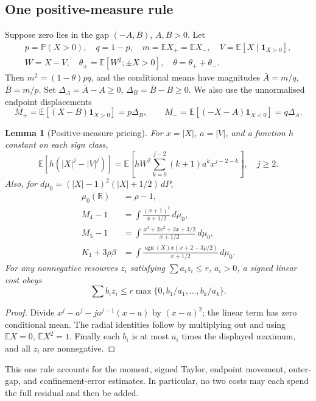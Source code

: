 \documentclass[11pt,a4paper]{article}
\numberwithin{equation}{section}
\newtheorem{lemma}[theorem]{Lemma}
\theoremstyle{definition}
\theoremstyle{remark}
\newcommand{\E}{\mathbb E}
\newcommand{\Pp}{\mathbb P}
\newcommand{\R}{\mathbb R}
\begin{document}
\subsection{One positive-measure rule}
Suppose zero lies in the gap $(-A,B)$, $A,B>0$. Let
\[\begin{gathered}
 p=\Pp(X>0),\quad q=1-p,\quad m=\E X_+=\E X_-,\quad V=\E[X\mid\mathbf1_{X>0}],\\
 W=X-V,\quad\theta_\pm=\E[W^2;\pm X>0],\quad\theta=\theta_++\theta_-.
\end{gathered}\]
Then $m^2=(1-\theta)pq$, and the conditional means have magnitudes
$\bar A=m/q$, $\bar B=m/p$. Set
$\Delta_A=\bar A-A\ge0$, $\Delta_B=\bar B-B\ge0$.
We also use the unnormalised endpoint displacements
\[
 M_+=\E[(X-B)\mathbf1_{X>0}]=p\Delta_B,\qquad
 M_-=\E[(-X-A)\mathbf1_{X<0}]=q\Delta_A.
\]

\begin{lemma}[Positive-measure pricing]\label{cut49:re:pricing}
For $x=|X|$, $a=|V|$, and a function $h$ constant on each sign class,
\begin{equation}\label{cut49:re:conditional}
 \E[h(|X|^j-|V|^j)]
 =\E\left[hW^2\sum_{k=0}^{j-2}(k+1)a^kx^{j-2-k}\right],\quad j\ge2.
\end{equation}
Also, for $d\mu_0=(|X|-1)^2(|X|+1/2)\,dP$,
\begin{align*}
 \mu_0(\R)&=\rho-1,\\
 M_4-1&=\int\frac{(x+1)^2}{x+1/2}\,d\mu_0,\\
 M_5-1&=\int\frac{x^3+2x^2+3x+3/2}{x+1/2}\,d\mu_0,\\
 K_1+3\rho\beta&=\int
  \frac{\operatorname{sgn}(X)x(x+2-3\rho/2)}{x+1/2}\,d\mu_0.
\end{align*}
For any nonnegative resources $z_i$ satisfying $\sum a_i z_i\le r$,
$a_i>0$, a signed linear cost obeys
\begin{equation}\label{cut49:re:simplex}
 \sum b_i z_i\le r\max\{0,b_1/a_1,\ldots,b_k/a_k\}.
\end{equation}
\end{lemma}
\begin{proof}
Divide $x^j-a^j-ja^{j-1}(x-a)$ by $(x-a)^2$; the linear term has
zero conditional mean. The radial identities follow by multiplying
out and using $\E X=0$, $\E X^2=1$. Finally each $b_i$ is at most
$a_i$ times the displayed maximum, and all $z_i$ are nonnegative.
\end{proof}

This one rule accounts for the moment, signed Taylor, endpoint movement,
outer-gap, and confinement-error estimates. In particular, no two costs
may each spend the full residual and then be added.
\end{document}
